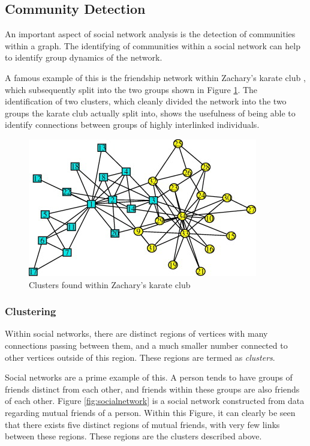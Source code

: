 \subsection{Community Detection}
An important aspect of social network analysis is the detection of communities within a graph. The identifying of communities within a social network can help to identify group dynamics of the network. 

A famous example of this is the friendship network within Zachary's karate club \cite{zachary77}, which subsequently split into the two groups shown in Figure \ref{fig:karate}. The identification of two clusters, which cleanly divided the network into the two groups the karate club actually split into, shows the usefulness of being able to identify connections between groups of highly interlinked individuals.

\begin{figure}%
\centering
\includegraphics[width=0.5\columnwidth]{./img/karate}%
\caption{Clusters found within Zachary's karate club \cite{zachary77,comellas10}}%
\label{fig:karate}%
\end{figure}

\subsubsection{Clustering}
Within social networks, there are distinct regions of vertices with many connections passing between them, and a much smaller number connected to other vertices outside of this region. These regions are termed as \emph{clusters}.

Social networks are a prime example of this. A person tends to have groups of friends distinct from each other, and friends within these groups are also friends of each other. Figure \ref{fig:socialnetwork} is a social network constructed from data regarding mutual friends of a person. Within this Figure, it can clearly be seen that there exists five distinct regions of mutual friends, with very few links between these regions. These regions are the clusters described above.


